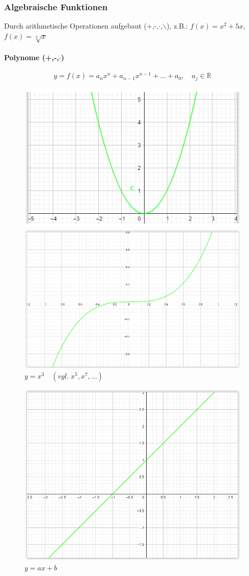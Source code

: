 \documentclass[12pt,a4paper]{article}%
\numberwithin{equation}{section}
\newcommand{\R}{\mathbb{R}} %
\newcommand{\subsubsubsection}{\paragraph}
\numberwithin{equation}{subsection}
\begin{document}
	  \subsubsection{Algebraische Funktionen}
	  Durch arithmetische Operationen aufgebaut (+,-,$\cdot$,$\backslash$), z.B.: \newline $f(x) = x^2 + 5x$, $f(x) = \sqrt[3]{x}$
    \subsubsubsection{Polynome (+,-,$\cdot$)}
    \begin{equation}
      y = f(x) = a_n x^n + a_{n-1} x^{n-1} + ... + a_0,\quad a_j \in \R
    \end{equation}  
		\vspace{-0.7cm}  	  
	  \begin{figure}[H] 
		\centering
		\begin{minipage}{.5\textwidth}
		  \centering
		  \includegraphics[width=0.7\linewidth]{funktionen_quadratisch.png}
		  \caption{$y = x^2\quad (vgl.\; x^4, x^6, ...)$}
		  \label{fig:funkt_quadr}
		\end{minipage}%
		\begin{minipage}{.5\textwidth}
		  \centering
		  \includegraphics[width=0.7\linewidth]{funktionen_kubisch.png}
		  \caption{$y = x^3 \quad (vgl.\;x^5, x^7, ...)$}
		  \label{fig:funkt_kub}
		\end{minipage}
		\end{figure}
		\vspace{-0.5cm}
		\begin{figure}[H]
		  \centering
		  \includegraphics[width=0.3\linewidth]{funktionen_linear.png}
		  \caption{$y = ax+b$}
		  \label{fig:funkt_lin}
		\end{figure}
		
\end{document}
